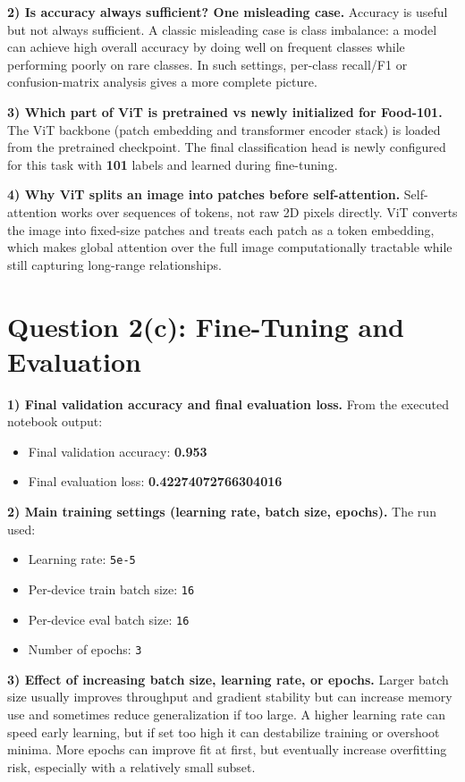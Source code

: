 \documentclass[11pt]{article}
\begin{document}
\textbf{2) Is accuracy always sufficient? One misleading case.}  
Accuracy is useful but not always sufficient. A classic misleading case is class imbalance: a model can achieve high overall accuracy by doing well on frequent classes while performing poorly on rare classes. In such settings, per-class recall/F1 or confusion-matrix analysis gives a more complete picture.

\textbf{3) Which part of ViT is pretrained vs newly initialized for Food-101.}  
The ViT backbone (patch embedding and transformer encoder stack) is loaded from the pretrained checkpoint. The final classification head is newly configured for this task with \textbf{101} labels and learned during fine-tuning.

\textbf{4) Why ViT splits an image into patches before self-attention.}  
Self-attention works over sequences of tokens, not raw 2D pixels directly. ViT converts the image into fixed-size patches and treats each patch as a token embedding, which makes global attention over the full image computationally tractable while still capturing long-range relationships.

\section*{Question 2(c): Fine-Tuning and Evaluation}

\textbf{1) Final validation accuracy and final evaluation loss.}  
From the executed notebook output:
\begin{itemize}
  \item Final validation accuracy: \textbf{0.953}
  \item Final evaluation loss: \textbf{0.42274072766304016}
\end{itemize}

\textbf{2) Main training settings (learning rate, batch size, epochs).}  
The run used:
\begin{itemize}
  \item Learning rate: \texttt{5e-5}
  \item Per-device train batch size: \texttt{16}
  \item Per-device eval batch size: \texttt{16}
  \item Number of epochs: \texttt{3}
\end{itemize}

\textbf{3) Effect of increasing batch size, learning rate, or epochs.}  
Larger batch size usually improves throughput and gradient stability but can increase memory use and sometimes reduce generalization if too large. A higher learning rate can speed early learning, but if set too high it can destabilize training or overshoot minima. More epochs can improve fit at first, but eventually increase overfitting risk, especially with a relatively small subset.
\end{document}
